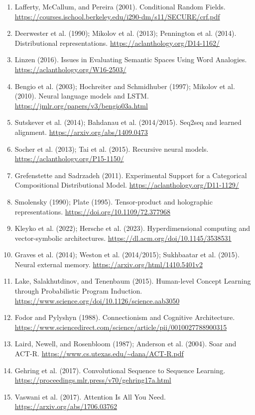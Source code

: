 \begin{enumerate}[leftmargin=*,itemsep=2pt]
\item Lafferty, McCallum, and Pereira (2001). Conditional Random Fields. \url{https://courses.ischool.berkeley.edu/i290-dm/s11/SECURE/crf.pdf}
\item Deerwester et al. (1990); Mikolov et al. (2013); Pennington et al. (2014). Distributional representations. \url{https://aclanthology.org/D14-1162/}
\item Linzen (2016). Issues in Evaluating Semantic Spaces Using Word Analogies. \url{https://aclanthology.org/W16-2503/}
\item Bengio et al. (2003); Hochreiter and Schmidhuber (1997); Mikolov et al. (2010). Neural language models and LSTM. \url{https://jmlr.org/papers/v3/bengio03a.html}
\item Sutskever et al. (2014); Bahdanau et al. (2014/2015). Seq2seq and learned alignment. \url{https://arxiv.org/abs/1409.0473}
\item Socher et al. (2013); Tai et al. (2015). Recursive neural models. \url{https://aclanthology.org/P15-1150/}
\item Grefenstette and Sadrzadeh (2011). Experimental Support for a Categorical Compositional Distributional Model. \url{https://aclanthology.org/D11-1129/}
\item Smolensky (1990); Plate (1995). Tensor-product and holographic representations. \url{https://doi.org/10.1109/72.377968}
\item Kleyko et al. (2022); Hersche et al. (2023). Hyperdimensional computing and vector-symbolic architectures. \url{https://dl.acm.org/doi/10.1145/3538531}
\item Graves et al. (2014); Weston et al. (2014/2015); Sukhbaatar et al. (2015). Neural external memory. \url{https://arxiv.org/html/1410.5401v2}
\item Lake, Salakhutdinov, and Tenenbaum (2015). Human-level Concept Learning through Probabilistic Program Induction. \url{https://www.science.org/doi/10.1126/science.aab3050}
\item Fodor and Pylyshyn (1988). Connectionism and Cognitive Architecture. \url{https://www.sciencedirect.com/science/article/pii/0010027788900315}
\item Laird, Newell, and Rosenbloom (1987); Anderson et al. (2004). Soar and ACT-R. \url{https://www.cs.utexas.edu/~dana/ACT-R.pdf}
\item Gehring et al. (2017). Convolutional Sequence to Sequence Learning. \url{https://proceedings.mlr.press/v70/gehring17a.html}
\item Vaswani et al. (2017). Attention Is All You Need. \url{https://arxiv.org/abs/1706.03762}

\end{enumerate}
